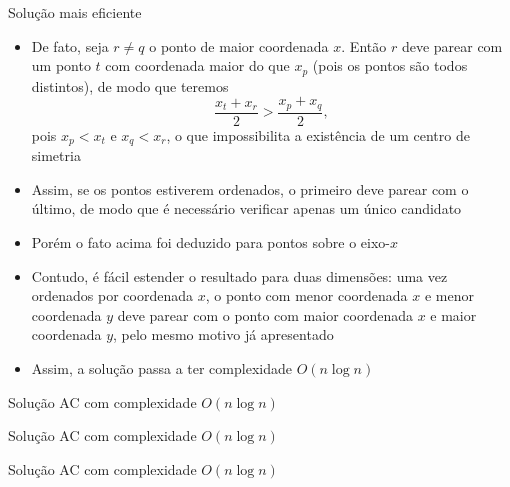\begin{frame}[fragile]{Solução mais eficiente}

    \begin{itemize}
        \item De fato, seja $r \neq q$ o ponto de maior coordenada $x$. Então $r$ deve parear
            com um ponto $t$ com coordenada maior do que $x_p$ (pois os pontos são todos
            distintos), de modo que teremos
        \[
            \frac{x_t + x_r}{2} > \frac{x_p + x_q}{2},
        \]
        pois $x_p < x_t$ e $x_q < x_r$, o que impossibilita a existência de um centro de simetria
        \pause

        \item Assim, se os pontos estiverem ordenados, o primeiro deve parear com o último, de modo
            que é necessário verificar apenas um único candidato
        \pause

        \item Porém o fato acima foi deduzido para pontos sobre o eixo-$x$
        \pause

        \item Contudo, é fácil estender o resultado para duas dimensões: uma vez ordenados por
            coordenada $x$, o ponto com menor coordenada $x$ e menor coordenada $y$ deve parear
            com o ponto com maior coordenada $x$ e maior coordenada $y$, pelo mesmo motivo
            já apresentado
        \pause

        \item Assim, a solução passa a ter complexidade $O(n\log  n)$
    \end{itemize}

\end{frame}

\begin{frame}[fragile]{Solução AC com complexidade $O(n\log n)$}
\end{frame}

\begin{frame}[fragile]{Solução AC com complexidade $O(n\log n)$}
\end{frame}

\begin{frame}[fragile]{Solução AC com complexidade $O(n\log n)$}
\end{frame}






